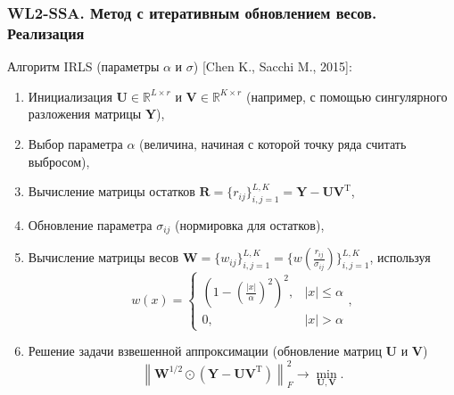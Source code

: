 \documentclass[10pt, ucs, notheorems, handout]{beamer}
\newcommand{\norm}[1]{\left\lVert#1\right\rVert}
\begin{document}
\begin{frame}
\frametitle{WL2-SSA. Метод с итеративным обновлением весов. Реализация}
\alert{Алгоритм IRLS} (параметры $\alpha$ и $\sigma$) [Chen K., Sacchi M., 2015]:\\
\footnotesize {
\begin{enumerate}
\item Инициализация $\mathbf{U}\in \mathbb{R}^{L\times r}$ и $\mathbf{V}\in \mathbb{R}^{K\times r}$ (например, с помощью сингулярного разложения матрицы $\mathbf{Y}$),
\item Выбор параметра $\alpha$ (величина, начиная с которой точку ряда считать выбросом),
\item  Вычисление матрицы остатков $\mathbf{R}=\{r_{ij}\}_{i,j=1}^{L,K} = \mathbf{Y}-\mathbf{U}\mathbf{V}^{\mathrm{T}}$,
\item  Обновление параметра $\sigma_{ij}$ (нормировка для остатков),
\item Вычисление матрицы весов $\mathbf{W} = \{w_{ij}\}_{i,j=1}^{L,K} = \{w(\frac{r_{ij}}{\sigma_{ij}})\}_{i,j=1}^{L,K} $, используя %
\begin{equation*}
w(x) = 
\begin{cases}
(1-(\frac{|x|}{\alpha})^2)^2, &|x|\le\alpha\\
0, &|x|>\alpha
\end{cases},%
\end{equation*}
\item Решение задачи взвешенной аппроксимации (обновление матриц $\mathbf{U}$ и $\mathbf{V}$)
\begin{equation*}
\norm{\mathbf{W}^{1/2}\odot(\mathbf{Y}-\mathbf{U}\mathbf{V}^{\mathrm{T}})}^2_F \longrightarrow \min_{\mathbf{U},\mathbf{V}}.
\end{equation*}	


\end{enumerate}}
\end{frame}
\end{document}
